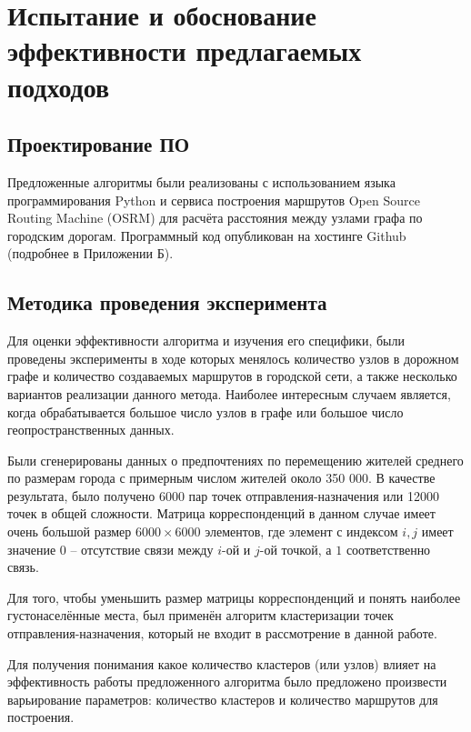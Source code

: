 \chapter{Испытание и обоснование эффективности предлагаемых подходов}
\section{Проектирование ПО}
Предложенные алгоритмы были реализованы с использованием языка программирования Python и сервиса построения 
маршрутов Open Source Routing Machine (OSRM) для расчёта расстояния между узлами графа по городским дорогам.
Программный код опубликован на хостинге Github (подробнее в Приложении Б).

\section{Методика проведения эксперимента}
Для оценки эффективности алгоритма и изучения его специфики, были проведены эксперименты в ходе которых 
менялось количество узлов в дорожном графе и количество создаваемых маршрутов в городской сети, а также 
несколько вариантов реализации данного метода. Наиболее интересным случаем является, когда обрабатывается 
большое число узлов в графе или большое число геопространственных данных.

Были сгенерированы данных о предпочтениях по перемещению жителей среднего по размерам города с примерным 
числом жителей около 350 000. В качестве результата, было получено 6000 пар точек отправления-назначения или 
12000 точек в общей сложности. Матрица корреспонденций в данном случае имеет очень большой размер 
\( 6000 \times 6000 \) элементов, где элемент с индексом \( i, j \) имеет значение \( 0 \) -- отсутствие связи 
между \( i \)-ой и \( j \)-ой точкой, а \( 1 \) соответственно связь.

Для того, чтобы уменьшить размер матрицы корреспонденций и понять наиболее густонаселённые места, был 
применён алгоритм кластеризации точек отправления-назначения, который не входит в рассмотрение в данной 
работе.


Для получения понимания какое количество кластеров (или узлов) влияет на эффективность работы предложенного 
алгоритма было предложено произвести варьирование параметров: количество кластеров и количество маршрутов для 
построения.

